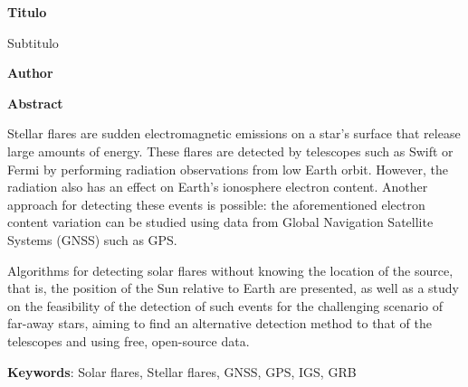 \thispagestyle{empty}
\begin{center}
    \Large
    \textbf{Titulo}
 
    \vspace{0.4cm}
    \large
    Subtitulo
 
    \vspace{0.4cm}
    \textbf{Author}
 
    \vspace{0.9cm}
    \textbf{Abstract}
\end{center}
Stellar flares are sudden electromagnetic emissions on a star's surface that release large amounts of energy. These flares are detected by telescopes such as Swift or Fermi by performing radiation observations from low Earth orbit. However, the radiation also has an effect on Earth’s ionosphere electron content. Another approach for detecting these events is possible: the aforementioned electron content variation can be studied using data from Global Navigation Satellite Systems (GNSS) such as GPS.

Algorithms for detecting solar flares without knowing the location of the source, that is, the position of the Sun relative to Earth are presented, as well as a study on the feasibility of the detection of such events for the challenging scenario of far-away stars, aiming to find an alternative detection method to that of the telescopes and using free, open-source data.

\textbf{Keywords}: Solar flares, Stellar flares, GNSS, GPS, IGS, GRB
